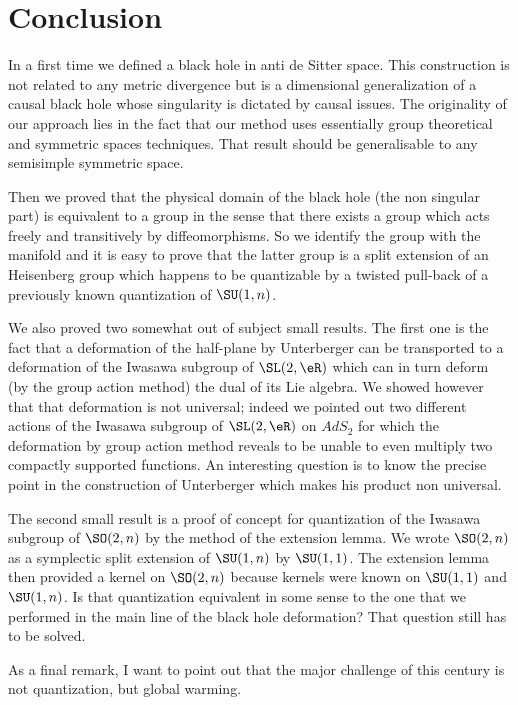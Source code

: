 
\section{Conclusion}

In a first time we defined a black hole in anti de Sitter space. This construction is not related to any metric divergence but is a dimensional generalization of a causal black hole whose singularity is dictated by causal issues. The originality of our approach lies in the fact that our method uses essentially group theoretical and symmetric spaces techniques. That result should be generalisable to any semisimple symmetric space.

Then we proved that the physical domain of the black hole (the non singular part) is equivalent to a group in the sense that there exists a group which acts freely and transitively by diffeomorphisms. So we identify the group with the manifold and it is easy to prove that the latter group is a split extension of an Heisenberg group which happens to be quantizable by a twisted pull-back of a previously known quantization of $\SU(1,n)$.

We also proved two somewhat out of subject small results. The first one is the fact that a deformation of the half-plane by Unterberger can be transported to a deformation of the Iwasawa subgroup of $\SL(2,\eR)$ which can in turn deform (by the group action method) the dual of its Lie algebra. We  showed however that that deformation is not universal; indeed we pointed out two different actions of the Iwasawa subgroup of $\SL(2,\eR)$ on $AdS_2$ for which the deformation by group action method reveals to be unable to even multiply two compactly supported functions. An interesting question is to know the precise point in the construction of Unterberger which makes his product non universal.

The second small result is a proof of concept for quantization of the Iwasawa subgroup of $\SO(2,n)$ by the method of the extension lemma. We wrote $\SO(2,n)$ as a symplectic split extension of $\SU(1,n)$ by $\SU(1,1)$. The extension lemma then provided a kernel on $\SO(2,n)$ because kernels were known on $\SU(1,1)$ and $\SU(1,n)$. Is that quantization equivalent in some sense to the one that we performed in the main line of the black hole deformation? That question still has to be solved.

As a final remark, I want to point out that the major challenge of this century is not quantization, but global warming.
